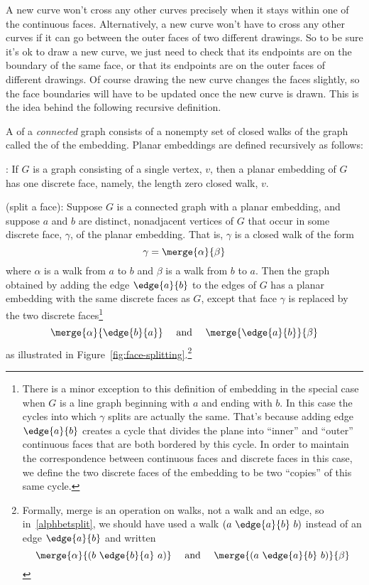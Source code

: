 A new curve won't cross any other curves precisely when it stays
within one of the continuous faces.  Alternatively, a new curve won't
have to cross any other curves if it can go between the outer faces of
two different drawings.  So to be sure it's ok to draw a new curve, we
just need to check that its endpoints are on the boundary of the same
face, or that its endpoints are on the outer faces of different
drawings.  Of course drawing the new curve changes the faces slightly,
so the face boundaries will have to be updated once the new curve is
drawn.  This is the idea behind the following recursive definition.

\begin{definition}\label{def:embedding}%
A  of a \emph{connected} graph consists of a
nonempty set of closed walks of the graph called the  of the embedding.  Planar embeddings are defined recursively
as follows:

: If $G$ is a graph consisting of a single
vertex, $v$, then a planar embedding of $G$ has one discrete face,
namely, the length zero closed walk, $v$.

 (split a face): Suppose $G$ is a
connected graph with a planar embedding, and suppose $a$ and $b$ are
distinct, nonadjacent vertices of $G$ that occur in some discrete
face, $\gamma$, of the planar embedding.  That is, $\gamma$ is a
closed walk of the form
\[
\gamma = \merge{\alpha}{\beta}
\]
where $\alpha$ is a walk from $a$ to $b$ and $\beta$ is a walk from
$b$ to $a$.  Then the graph obtained by adding the edge $\edge{a}{b}$
to the edges of $G$ has a planar embedding with the same discrete
faces as $G$, except that face $\gamma$ is replaced by the two
discrete faces\footnote{\label{C} There is a minor exception to this
  definition of embedding in the special case when $G$ is a line graph
  beginning with $a$ and ending with $b$.  In this case the cycles
  into which $\gamma$ splits are actually the same.  That's because
  adding edge $\edge{a}{b}$ creates a cycle that divides the plane
  into ``inner'' and ``outer'' continuous faces that are both bordered
  by this cycle.  In order to maintain the correspondence between
  continuous faces and discrete faces in this case, we define the two
  discrete faces of the embedding to be two ``copies'' of this same
  cycle.}
\begin{equation}\label{alphbetsplit}
\merge{\alpha}{\edge{b}{a}}
 \quad \text{ and } \quad \merge{\edge{a}{b}}{\beta}
\end{equation}
as illustrated in Figure~\ref{fig:face-splitting}.\footnote{Formally,
  merge is an operation on walks, not a walk and an edge, so
  in~\eqref{alphbetsplit}, we should have used a walk $(a\ \edge{a}{b}\ b)$
  instead of an edge $\edge{a}{b}$ and written
\[
\merge{\alpha}{(b\ \edge{b}{a}\ a)}
 \quad \text{ and } \quad \merge{(a\ \edge{a}{b}\ b)}{\beta}
\]
}


\end{definition}
